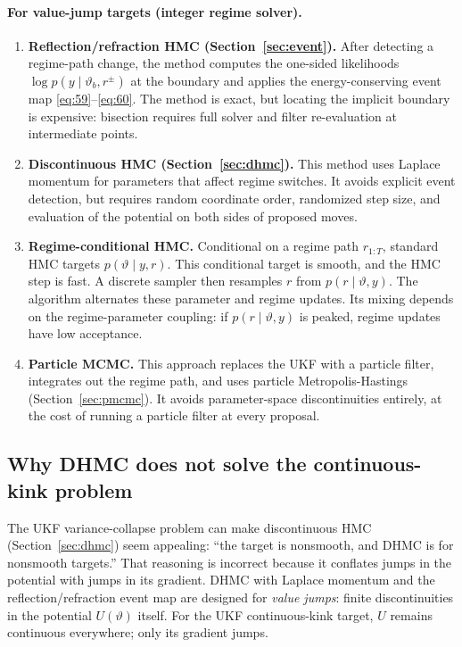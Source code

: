 \documentclass[11pt]{article}
\begin{document}
\paragraph{For value-jump targets (integer regime solver).}
\begin{enumerate}
\item \textbf{Reflection/refraction HMC (Section~\ref{sec:event}).} After detecting a regime-path change, the method computes the one-sided likelihoods $\log p(y\mid\vartheta_b, r^\pm)$ at the boundary and applies the energy-conserving event map \eqref{eq:59}--\eqref{eq:60}. The method is exact, but locating the implicit boundary is expensive: bisection requires full solver and filter re-evaluation at intermediate points.
\item \textbf{Discontinuous HMC (Section~\ref{sec:dhmc}).} This method uses Laplace momentum for parameters that affect regime switches. It avoids explicit event detection, but requires random coordinate order, randomized step size, and evaluation of the potential on both sides of proposed moves.
\item \textbf{Regime-conditional HMC.} Conditional on a regime path $r_{1:T}$, standard HMC targets $p(\vartheta\mid y,r)$. This conditional target is smooth, and the HMC step is fast. A discrete sampler then resamples $r$ from $p(r\mid\vartheta,y)$. The algorithm alternates these parameter and regime updates. Its mixing depends on the regime-parameter coupling: if $p(r\mid\vartheta,y)$ is peaked, regime updates have low acceptance.
\item \textbf{Particle MCMC.} This approach replaces the UKF with a particle filter, integrates out the regime path, and uses particle Metropolis-Hastings (Section~\ref{sec:pmcmc}). It avoids parameter-space discontinuities entirely, at the cost of running a particle filter at every proposal.
\end{enumerate}

\subsection{Why DHMC does not solve the continuous-kink problem}\label{sec:dhmc-limitation}

The UKF variance-collapse problem can make discontinuous HMC (Section~\ref{sec:dhmc}) seem appealing: ``the target is nonsmooth, and DHMC is for nonsmooth targets.'' That reasoning is incorrect because it conflates jumps in the potential with jumps in its gradient. DHMC with Laplace momentum and the reflection/refraction event map are designed for \emph{value jumps}: finite discontinuities in the potential $U(\vartheta)$ itself. For the UKF continuous-kink target, $U$ remains continuous everywhere; only its gradient jumps.
\end{document}
